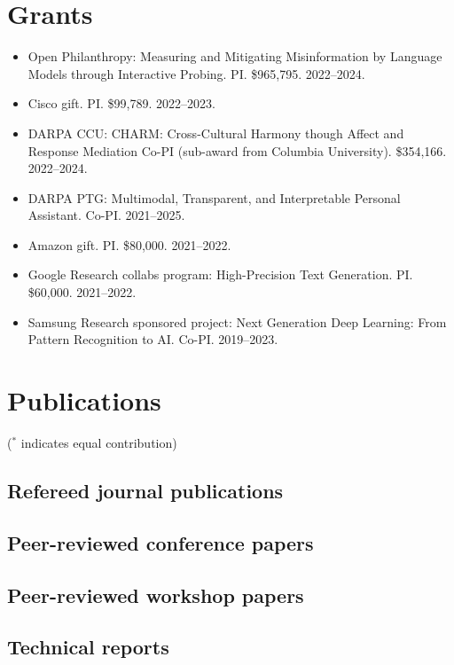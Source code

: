 \documentclass[a4paper,11pt]{article}
\begin{document}
\section{Grants}
\begin{itemize}[itemsep=-5pt]
    \item Open Philanthropy: Measuring and Mitigating Misinformation by Language Models through Interactive Probing. PI. \$965,795. 2022--2024.
    \item Cisco gift. PI. \$99,789. 2022--2023. 
    \item DARPA CCU: CHARM: Cross-Cultural Harmony though Affect and Response Mediation 
        Co-PI (sub-award from Columbia University). \$354,166. 2022--2024.
    \item DARPA PTG: Multimodal, Transparent, and Interpretable Personal Assistant.
        Co-PI. 2021--2025.
    \item Amazon gift. PI. \$80,000. 2021--2022. 
    \item Google Research collabs program: High-Precision Text Generation.
        PI. \$60,000. 2021--2022. 
    \item Samsung Research sponsored project: Next Generation Deep Learning: From Pattern Recognition to AI. Co-PI. 2019--2023.
\end{itemize}

\section{Publications}
($^*$ indicates equal contribution)
\subsection{Refereed journal publications}


\subsection{Peer-reviewed conference papers}


\subsection{Peer-reviewed workshop papers}


\subsection{Technical reports}

\end{document}
